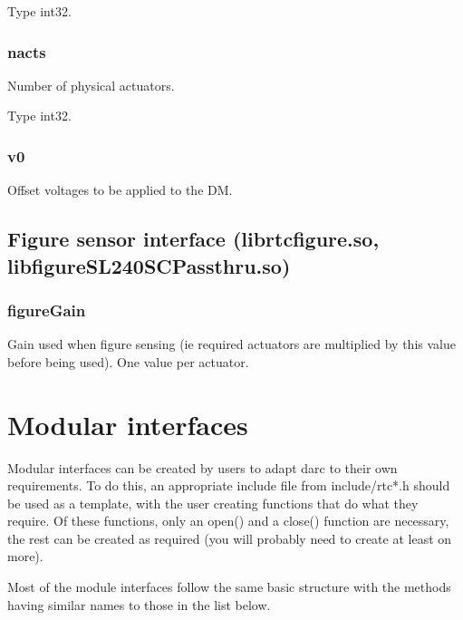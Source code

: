 \documentclass[a4,10pt]{article}
\begin{document}
Type int32.

\subsubsection{nacts}
Number of physical actuators.

Type int32.

\subsubsection{v0}
Offset voltages to be applied to the DM.




\subsection{Figure sensor interface (librtcfigure.so, libfigureSL240SCPassthru.so)}
\subsubsection{figureGain}
Gain used when figure sensing (ie required actuators are multiplied by
this value before being used).  One value per actuator.



\section{Modular interfaces}
Modular interfaces can be created by users to adapt darc to their own
requirements.  To do this, an appropriate include file from
include/rtc*.h should be used as a template, with the user creating
functions that do what they require.  Of these functions, only an
open() and a close() function are necessary, the rest can be created
as required (you will probably need to create at least on more).

Most of the module interfaces follow the same basic structure with the
methods having similar names to those in the list below.
\end{document}
